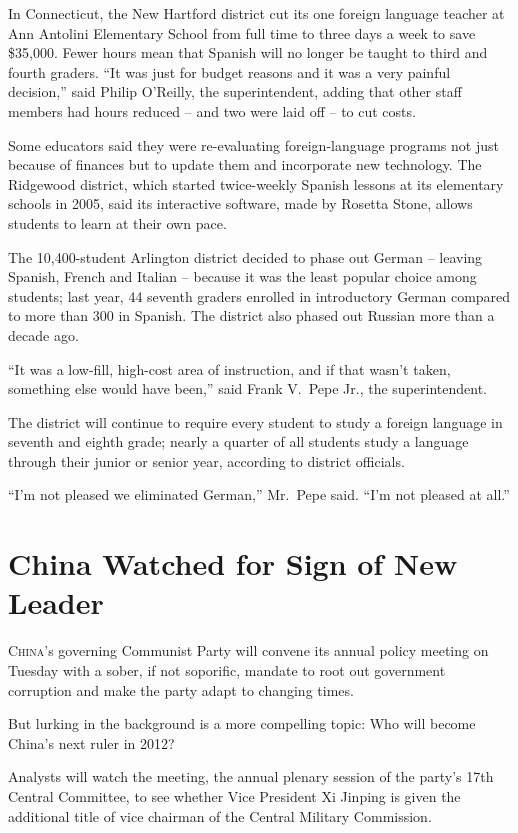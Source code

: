 ﻿\documentclass[12pt]{article}
\begin{document}
In Connecticut, the New Hartford district cut its one foreign language teacher at Ann Antolini
Elementary School from full time to three days a week to save \$35,000. Fewer hours mean that
Spanish will no longer be taught to third and fourth graders. ``It was just for budget reasons and
it was a very painful decision,'' said Philip O'Reilly, the superintendent, adding that other staff
members had hours reduced -- and two were laid off -- to cut costs.

Some educators said they were re-evaluating foreign-language programs not just because of finances
but to update them and incorporate new technology. The Ridgewood district, which started
twice-weekly Spanish lessons at its elementary schools in 2005, said its interactive software, made
by Rosetta Stone, allows students to learn at their own pace.

The 10,400-student Arlington district decided to phase out German -- leaving Spanish, French and
Italian -- because it was the least popular choice among students; last year, 44 seventh graders
enrolled in introductory German compared to more than 300 in Spanish. The district also phased out
Russian more than a decade ago.

``It was a low-fill, high-cost area of instruction, and if that wasn't taken, something else would
have been,'' said Frank V.~Pepe Jr., the superintendent.

The district will continue to require every student to study a foreign language in seventh and
eighth grade; nearly a quarter of all students study a language through their junior or senior year,
according to district officials.

``I'm not pleased we eliminated German,'' Mr.~Pepe said. ``I'm not pleased at all.''

\section{China Watched for Sign of New Leader}

\lettrine{C}{hina}'s governing Communist Party will convene its annual policy meeting on Tuesday
with a sober\cite{sober}, if not soporific\cite{soporific}, mandate\cite{mandate} to root out
government corruption and make the party adapt to changing times.

But lurking\cite{lurking} in the background is a more compelling topic: Who will become China's next
ruler in 2012?

Analysts will watch the meeting, the annual plenary session of the party's 17th Central Committee,
to see whether Vice President Xi Jinping is given the additional title of vice chairman of the
Central Military Commission.
\end{document}
